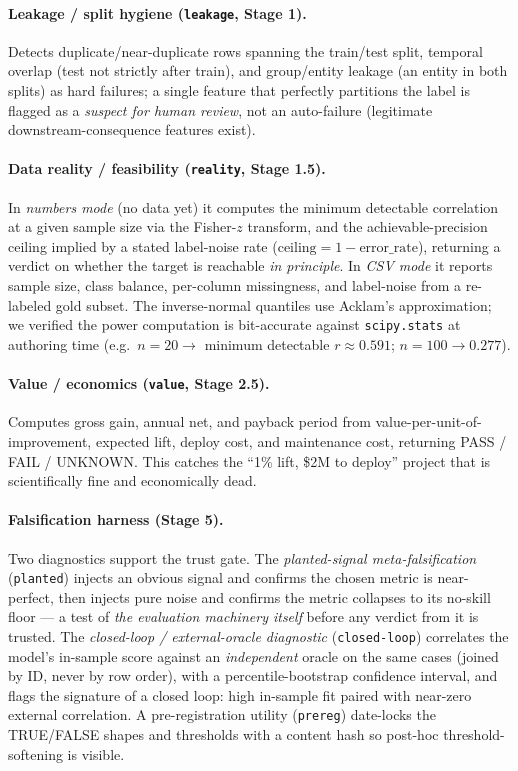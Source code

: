 \documentclass[11pt]{article}
\begin{document}
\paragraph{Leakage / split hygiene (\texttt{leakage}, Stage 1).} Detects duplicate/near-duplicate rows
spanning the train/test split, temporal overlap (test not strictly after train), and group/entity
leakage (an entity in both splits) as hard failures; a single feature that perfectly partitions the
label is flagged as a \emph{suspect for human review}, not an auto-failure (legitimate
downstream-consequence features exist).

\paragraph{Data reality / feasibility (\texttt{reality}, Stage 1.5).} In \emph{numbers mode} (no data
yet) it computes the minimum detectable correlation at a given sample size via the Fisher-$z$
transform, and the achievable-precision ceiling implied by a stated label-noise rate
($\text{ceiling} = 1 - \text{error\_rate}$), returning a verdict on whether the target is reachable
\emph{in principle}. In \emph{CSV mode} it reports sample size, class balance, per-column missingness,
and label-noise from a re-labeled gold subset. The inverse-normal quantiles use Acklam's
approximation; we verified the power computation is bit-accurate against \texttt{scipy.stats} at
authoring time (e.g.\ $n{=}20 \rightarrow$ minimum detectable $r \approx 0.591$; $n{=}100 \rightarrow
0.277$).

\paragraph{Value / economics (\texttt{value}, Stage 2.5).} Computes gross gain, annual net, and
payback period from value-per-unit-of-improvement, expected lift, deploy cost, and maintenance cost,
returning PASS / FAIL / UNKNOWN. This catches the ``1\% lift, \$2M to deploy'' project that is
scientifically fine and economically dead.

\paragraph{Falsification harness (Stage 5).} Two diagnostics support the trust gate. The
\emph{planted-signal meta-falsification} (\texttt{planted}) injects an obvious signal and confirms the
chosen metric is near-perfect, then injects pure noise and confirms the metric collapses to its
no-skill floor --- a test of \emph{the evaluation machinery itself} before any verdict from it is
trusted. The \emph{closed-loop / external-oracle diagnostic} (\texttt{closed-loop}) correlates the
model's in-sample score against an \emph{independent} oracle on the same cases (joined by ID, never by
row order), with a percentile-bootstrap confidence interval, and flags the signature of a closed loop:
high in-sample fit paired with near-zero external correlation. A pre-registration utility
(\texttt{prereg}) date-locks the TRUE/FALSE shapes and thresholds with a content hash so post-hoc
threshold-softening is visible.
\end{document}
